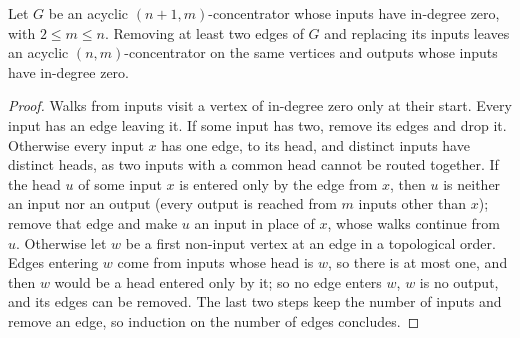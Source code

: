 \begin{lemma}
  \label{lem:lowerbounds-algebraic-concentrator-elimination}
  \leanok
  Let $G$ be an acyclic $(n+1,m)$-concentrator whose inputs have in-degree zero, with
  $2\le m\le n$. Removing at least two edges of $G$ and replacing its inputs leaves an acyclic
  $(n,m)$-concentrator on the same vertices and outputs whose inputs have in-degree zero.
\end{lemma}
\begin{proof}
  \leanok
  Walks from inputs visit a vertex of in-degree zero only at their start. Every input has an
  edge leaving it. If some input has two, remove its edges and drop it. Otherwise every input
  $x$ has one edge, to its head, and distinct inputs have distinct heads, as two inputs with a
  common head cannot be routed together. If the head $u$ of some input $x$ is entered only by
  the edge from $x$, then $u$ is neither an input nor an output (every output is reached from
  $m$ inputs other than $x$); remove that edge and make $u$ an input in place of $x$, whose walks
  continue from $u$. Otherwise let $w$ be a first non-input vertex at an edge in a topological
  order. Edges entering $w$ come from inputs whose head is $w$, so there is at most one, and then
  $w$ would be a head entered only by it; so no edge enters $w$, $w$ is no output, and its edges
  can be removed. The last two steps keep the number of inputs and remove an edge, so induction
  on the number of edges concludes.
\end{proof}

